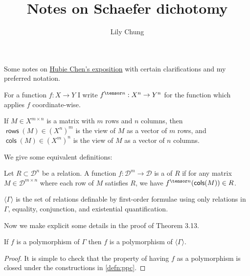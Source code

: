\documentclass{article}
\title{Notes on Schaefer dichotomy}
\author{Lily Chung}
\date{}
\newcommand*{\D}{\mathcal{D}}
\DeclareMathOperator{\rows}{\mathsf{rows}}
\DeclareMathOperator{\cols}{\mathsf{cols}}
\newcommand*{\ppc}[1]{\langle {#1} \rangle}
\begin{document}
\maketitle

Some notes on \href{https://arxiv.org/abs/cs/0611018}{Hubie Chen's exposition} with certain clarifications and my preferred notation.

For a function $f : X \to Y$ I write $f^{\tensor n} : X^n \to Y^n$ for the function which applies $f$ coordinate-wise.

If $M \in X^{m \times n}$ is a matrix with $m$ rows and $n$ columns, then $\rows(M) \in (X^n)^m$ is the view of $M$ as a vector of $m$ rows,
and $\cols(M) \in (X^m)^n$ is the view of $M$ as a vector of $n$ columns.

We give some equivalent definitions:

\begin{definition}
  Let $R \subset \D^n$ be a relation.
  A function $f : \D^m \to \D$ is a  of $R$ if for any matrix $M \in \D^{m \times n}$ where each row of $M$ satisfies $R$,
  we have $f^{\tensor n}(\cols(M)) \in R$.
\end{definition}

\begin{definition}
  \label{defn:ppc}
  $\ppc{\Gamma}$ is the set of relations definable by first-order formulae using only relations in $\Gamma$, equality, conjunction, and existential quantification.
\end{definition}

\bigskip

Now we make explicit some details in the proof of Theorem 3.13.

\begin{lemma}
  \label{lem:polyppc}
  If $f$ is a polymorphism of $\Gamma$ then $f$ is a polymorphism of $\ppc{\Gamma}$.
\end{lemma}
\begin{proof}
  It is simple to check that the property of having $f$ as a polymorphism is closed under the constructions in \cref{defn:ppc}.
\end{proof}
\end{document}
